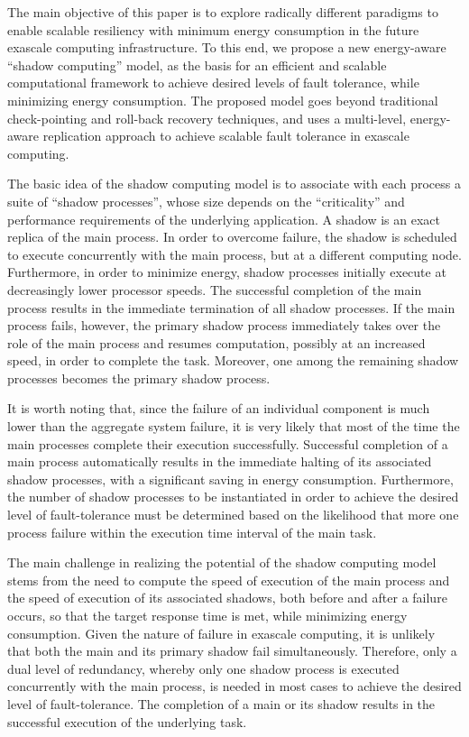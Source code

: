 The main objective of this paper is to explore radically different
paradigms to enable scalable resiliency with minimum energy
consumption in the future exascale computing infrastructure. To this
end, we propose a new energy-aware ``shadow computing'' model, as the
basis for an efficient and scalable computational framework to achieve
desired levels of fault tolerance, while minimizing energy
consumption. The proposed model goes beyond traditional check-pointing
and roll-back recovery techniques, and uses a multi-level,
energy-aware replication approach to achieve scalable fault tolerance
in exascale computing.

The basic idea of the shadow computing model is to associate with each
process a suite of ``shadow processes'', whose size depends on the
``criticality'' and performance requirements of the underlying
application. A shadow is an exact replica of the main process. In
order to overcome failure, the shadow is scheduled to execute
concurrently with the main process, but at a different computing
node. Furthermore, in order to minimize energy, shadow processes
initially execute at decreasingly lower processor speeds. The
successful completion of the main process results in the immediate
termination of all shadow processes. If the main process fails, however,
the primary shadow process immediately takes over the role of the main
process and resumes computation, possibly at an increased speed, in
order to complete the task. Moreover, one among the remaining shadow processes
becomes the primary shadow process.

It is worth noting that, since the failure of an individual component
is much lower than the aggregate system failure, it is very likely
that most of the time the main processes complete their execution
successfully. Successful completion of a main process automatically
results in the immediate halting of its associated shadow processes,
with a significant saving in energy consumption. Furthermore, the number
of shadow processes to be instantiated in order to achieve the desired level
of fault-tolerance must be determined based on the likelihood that
more one process failure within the execution time interval of the main
task.

The main challenge in realizing the
potential of the shadow computing model stems from the need to compute
the speed of execution of the main process and the speed of execution
of its associated shadows, both before and after a failure occurs, so
that the target response time is met, while minimizing energy
consumption. Given the nature of failure in exascale
computing, it is unlikely that both the main and its primary shadow
fail simultaneously. Therefore, only a dual level of redundancy,
whereby only one shadow process is executed concurrently with the main
process, is needed in most cases to achieve the desired level of
fault-tolerance. The completion of a main or its shadow results in the
successful execution of the underlying task.

